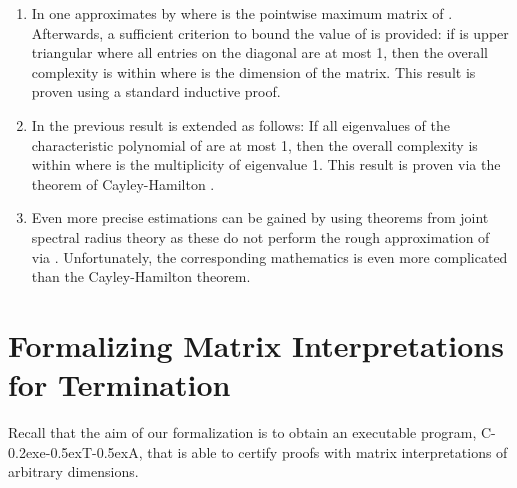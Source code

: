 \documentclass[a4paper]{llncs}
\newcommand\ceta{\textsf{C\kern-0.2exe\kern-0.5exT\kern-0.5exA}\xspace}
\begin{document}
\begin{enumerate}
\item 
\label{easy}
In \cite{MSW08} one approximates 
  by  where  is the pointwise maximum matrix of .
  Afterwards, a sufficient criterion to bound
  the value of  is provided: if  is upper triangular where all
  entries on the diagonal are at most 1, then the overall complexity is within
   where  is the dimension of the matrix. This result is proven
  using a standard inductive proof.
\item 
\label{cayley}
In \cite{NZM10} the previous result is extended 
  as follows:
  If all eigenvalues of the characteristic polynomial of  
  are at most 1, then the overall complexity is 
  within  where  is the multiplicity of eigenvalue 1.
  This result is proven via the theorem of Cayley-Hamilton \cite{Rose}.
\item 
\label{joint}
Even more precise estimations can be gained by using theorems from joint
  spectral radius theory \cite{JSR,CAI11} as these do not perform the rough 
  approximation of
   via . Unfortunately, the corresponding mathematics 
   is even
  more complicated than the Cayley-Hamilton theorem.
\end{enumerate}


\section{Formalizing Matrix Interpretations for Termination}
\label{matrix}

Recall that the aim of our formalization is to
obtain an executable program, \ceta, that is able to certify
proofs with matrix interpretations of arbitrary dimensions.
\end{document}
